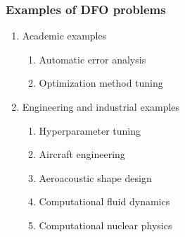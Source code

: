 \documentclass{polyu-presentation}
\begin{document}
\begin{frame}
    \frametitle{Examples of DFO problems}

    \begin{enumerate}
        \item Academic examples
        \begin{enumerate}
            \item Automatic error analysis \parencite{Higham_1993,Higham_2002}
            \item Optimization method tuning \parencite{Audet_Orban_2006}
        \end{enumerate}
        \item Engineering and industrial examples
        \begin{enumerate}
            \item \alert<2>{Hyperparameter tuning} \parencite{Ghanbari_Scheinberg_2017}
            \item \alert<2>{Aircraft engineering}~\parencite{Gazaix_Etal_2019}
            \item Aeroacoustic shape design \parencite{Marsden_2004,Marsden_Etal_2004}
            \item Computational fluid dynamics \parencite{Duvigneau_Visonneau_2004}
            \item Computational nuclear physics \parencite{Eldred_Etal_2022}
        \end{enumerate}
    \end{enumerate}
\end{frame}
\end{document}
